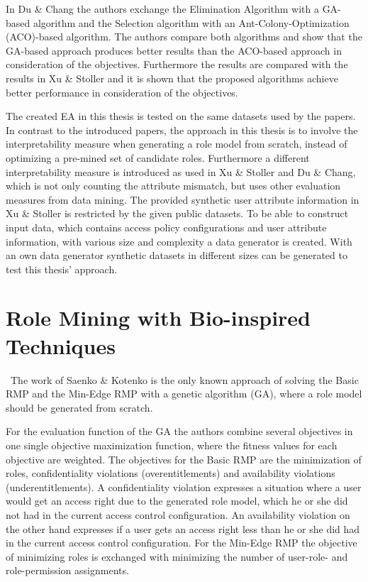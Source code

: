 In Du \& Chang\cite{DuChang} the authors exchange the Elimination Algorithm with a GA-based algorithm and the Selection algorithm with an Ant-Colony-Optimization (ACO)-based algorithm. The authors compare both algorithms and show that the GA-based approach produces better results than the ACO-based approach in consideration of the objectives. Furthermore the results are compared with the results in Xu \& Stoller\cite{Xu} and it is shown that the proposed algorithms achieve better performance in consideration of the objectives.

The created EA in this thesis is tested on the same datasets used by the papers. In contrast to the introduced papers, the approach in this thesis is to involve the interpretability measure when generating a role model from scratch, instead of optimizing a pre-mined set of candidate roles. Furthermore a different interpretability measure is introduced as used in Xu \& Stoller\cite{Xu} and Du \& Chang\cite{DuChang}, which is not only counting the attribute mismatch, but uses other evaluation measures from data mining.
The provided synthetic user attribute information in Xu \& Stoller\cite{Xu} is restricted by the given public datasets. To be able to construct input data, which contains access policy configurations and user attribute information, with various size and complexity a data generator is created. With an own data generator synthetic datasets in different sizes can be generated to test this thesis' approach.

\section{Role Mining with Bio-inspired Techniques}
\label{sec:relatedWork3}\
The work of Saenko \& Kotenko \cite{Igor} \cite{saenko2012design} is the only known approach of solving the Basic RMP and the Min-Edge RMP with a genetic algorithm (GA), where a role model should be generated from scratch.

For the evaluation function of the GA the authors combine several objectives in one single objective maximization function, where the fitness values for each objective are weighted. The objectives for the Basic RMP are the minimization of roles, confidentiality violations (overentitlements) and availability violations (underentitlements). A confidentiality violation expresses a situation where a user would get an access right due to the generated role model, which he or she did not had in the current access control configuration. An availability violation on the other hand expresses if a user gets an access right less than he or she did had in the current access control configuration. For the Min-Edge RMP\cite{4497438} the objective of minimizing roles is exchanged with minimizing the number of user-role- and role-permission assignments.


